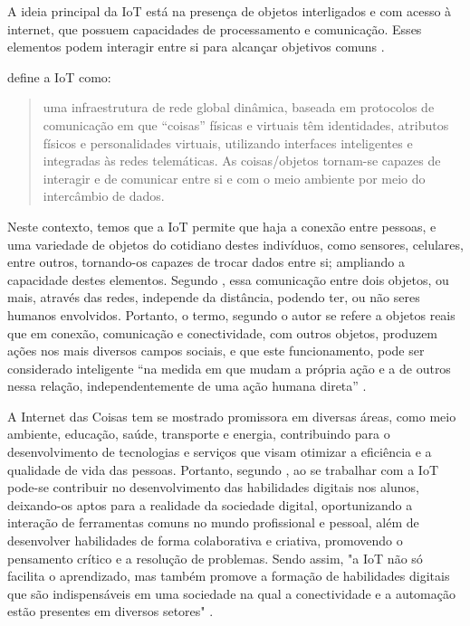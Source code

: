 \documentclass[portuguese]{textolivre}
\begin{document}
A ideia principal da IoT está na presença de objetos interligados e com acesso à internet, que possuem capacidades de processamento e comunicação. Esses elementos podem interagir entre si para alcançar objetivos comuns \cite{Gubbi2013}.

\textcite[p. 19-20]{lemos} define a IoT como:

\begin{quote}
	uma infraestrutura de rede global dinâmica, baseada em protocolos de comunicação em que  “coisas” físicas e virtuais têm identidades, atributos físicos e personalidades virtuais, utilizando interfaces inteligentes e integradas às redes telemáticas. As coisas/objetos tornam-se capazes de interagir e de comunicar entre si e com o meio ambiente por meio do intercâmbio de dados.
\end{quote}

Neste contexto, temos que a IoT permite que haja a conexão entre pessoas, e  uma variedade de objetos do cotidiano destes indivíduos, como sensores, celulares, entre outros, tornando-os capazes de trocar dados entre si; ampliando a capacidade destes elementos. Segundo \textcite{lemos}, essa comunicação entre dois objetos, ou mais, através das redes, independe da distância, podendo ter, ou não seres humanos envolvidos. Portanto, o termo, segundo o autor se refere a objetos reais que em conexão, comunicação e conectividade, com outros objetos,  produzem ações nos mais diversos campos sociais, e que este funcionamento, pode ser considerado inteligente “na medida em que mudam a própria ação e a de outros nessa relação, independentemente de uma ação humana direta” \cite [p. 27]{lemos}.  

A Internet das Coisas tem se mostrado promissora em diversas áreas, como meio ambiente, educação, saúde, transporte e energia, contribuindo para o desenvolvimento de tecnologias e serviços que visam otimizar a eficiência e a qualidade de vida das pessoas. Portanto, segundo \textcite {cremonini}, ao se trabalhar com a  IoT pode-se contribuir no desenvolvimento das habilidades digitais nos alunos, deixando-os aptos para a realidade da sociedade digital, oportunizando a interação de ferramentas comuns no mundo profissional e pessoal, além de desenvolver habilidades de forma colaborativa  e  criativa, promovendo o pensamento crítico e a resolução de problemas. Sendo assim, "a IoT não só facilita o aprendizado, mas também  promove a formação de habilidades digitais que são indispensáveis em uma sociedade na qual a conectividade e a automação estão presentes em diversos setores" \cite [p. 7795]{cremonini}.
\end{document}
